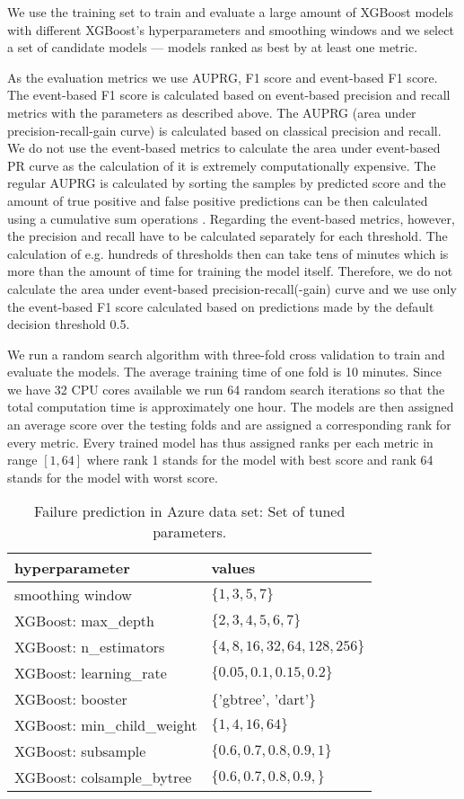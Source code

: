 We use the training set to train and evaluate a large amount of XGBoost models with different XGBoost's hyperparameters and smoothing windows and we select a set of candidate models --- models ranked as best by at least one metric.

As the evaluation metrics we use AUPRG, F1 score and event-based F1 score.
The event-based F1 score is calculated based on event-based precision and recall metrics with the parameters as described above.
The AUPRG (area under precision-recall-gain curve) is calculated based on classical precision and recall.
We do not use the event-based metrics to calculate the area under event-based PR curve as the calculation of it is extremely computationally expensive.
The regular AUPRG is calculated by sorting the samples by predicted score and the amount of true positive and false positive predictions can be then calculated using a cumulative sum operations \cite{pr_efficient}.
Regarding the event-based metrics, however, the precision and recall have to be calculated separately for each threshold.
The calculation of e.g. hundreds of thresholds then can take tens of minutes which is more than the amount of time for training the model itself.
Therefore, we do not calculate the area under event-based precision-recall(-gain) curve and we use only the event-based F1 score calculated based on predictions made by the default decision threshold 0.5.

We run a random search algorithm with three-fold cross validation to train and evaluate the models.
The average training time of one fold is 10 minutes.
Since we have 32 CPU cores available we run 64 random search iterations so that the total computation time is approximately one hour.
The models are then assigned an average score over the testing folds and are assigned a corresponding rank for every metric.
Every trained model has thus assigned ranks per each metric in range $[1, 64]$ where rank 1 stands for the model with best score and rank 64 stands for the model with worst score.

\begin{table}
    \centering
    \begin{tabular}{ll}
    hyperparameter
    & values\\
    \hline
    smoothing window & $\{1, 3, 5, 7\}$ \\
    XGBoost: max\_depth & $\{2, 3, 4, 5, 6, 7\}$ \\
    XGBoost: n\_estimators & $\{4, 8, 16, 32, 64, 128, 256\}$ \\
    XGBoost: learning\_rate & $\{0.05, 0.1, 0.15, 0.2\}$ \\
    XGBoost: booster & \{'gbtree', 'dart'\} \\
    XGBoost: min\_child\_weight & $\{ 1,  4, 16, 64\}$ \\
    XGBoost: subsample & $\{0.6, 0.7, 0.8, 0.9, 1\}$ \\
    XGBoost: colsample\_bytree & $\{0.6, 0.7, 0.8, 0.9, \}$ \\
    \end{tabular}
    \caption{Failure prediction in Azure data set: Set of tuned parameters.}
    \label{tab:experiments_failure_prediction_azure_parameters}
\end{table}

